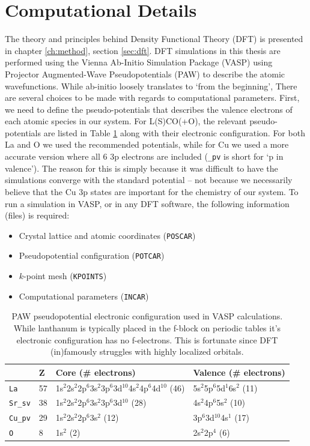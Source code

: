 \section{Computational Details}
The theory and principles behind Density Functional Theory (DFT) is presented in chapter \ref{ch:method}, section \ref{sec:dft}. DFT simulations in this thesis are performed using the Vienna Ab-Initio Simulation Package (VASP) \cite{Kresse1993a, Kresse1994, Kresse1996, Kresse1996a} using Projector Augmented-Wave Pseudopotentials (PAW) \cite{Blochl1994a, Kresse1999} to describe the atomic wavefunctions. While ab-initio loosely translates to `from the beginning', There are several choices to be made with regards to computational parameters. First, we need to define the pseudo-potentials that describes the valence electrons of each atomic species in our system. For L(S)CO(+O), the relevant pseudo-potentials are listed in Table \ref{tab:vasp_pseudo} along with their electronic configuration. For both La and O we used the recommended potentials, while for Cu we used a more accurate version where all 6 3p electrons are included (\verb|_pv| is short for `p in valence'). The reason for this is simply because it was difficult to have the simulations converge with the standard potential -- not because we necessarily believe that the Cu 3p states are important for the chemistry of our system. To run a simulation in VASP, or in any DFT software, the following information (files) is required:

\begin{itemize}
	\item Crystal lattice and atomic coordinates (\texttt{POSCAR})
	\item Pseudopotential configuration (\texttt{POTCAR})
	\item $k$-point mesh (\texttt{KPOINTS})
	\item Computational parameters (\texttt{INCAR})
\end{itemize}

\begin{table}[b]
	\centering
	\begin{tabular}{@{}llll@{}}
	\toprule
	 & Z & Core (\# electrons) & Valence (\# electrons)                        \\ \midrule
	\texttt{La} & 57 & 1s$^2$2s$^2$2p$^6$3s$^2$3p$^6$3d$^{10}$4s$^2$4p$^6$4d$^{10}$ (46) & 5s$^2$5p$^6$5d$^1$6s$^2$ (11) \\
	\texttt{Sr\_sv} & 38 & 1s$^2$2s$^2$2p$^6$3s$^2$3p$^6$3d$^{10}$ (28) & 4s$^2$4p$^6$5s$^2$ (10) \\
	\texttt{Cu\_pv} & 29 & 1s$^2$2s$^2$2p$^6$3s$^2$ (12) & 3p$^6$3d$^{10}$4s$^1$ (17)      \\
	\texttt{O} & 8 & 1s$^2$ (2) & 2s$^2$2p$^4$ (6) \\ \bottomrule
	\end{tabular}
	\caption[VASP Pseudopotentials]{PAW pseudopotential electronic configuration used in VASP calculations. While lanthanum is typically placed in the f-block on periodic tables it's electronic configuration has no f-electrons. This is fortunate since DFT (in)famously struggles with highly localized orbitals.}
	\label{tab:vasp_pseudo}
\end{table}	

